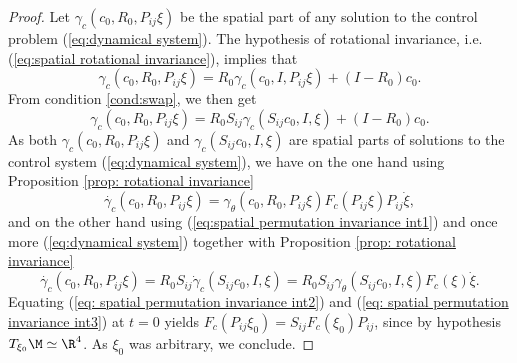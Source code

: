 \begin{proof}
Let $\gamma_c(c_0, R_0, P_{ij} \xi)$ be the spatial part of any solution to the control problem (\ref{eq:dynamical system}). The hypothesis of rotational invariance, i.e. (\ref{eq:spatial rotational invariance}), implies that
\begin{equation}
	\gamma_c(c_0, R_0, P_{ij} \xi) = R_0 \gamma_c(c_0, I, P_{ij} \xi) + (I - R_0)c_0.
\end{equation}
From condition \ref{cond:swap}, we then get
\begin{equation}
\label{eq:spatial permutation invariance int1}
	\gamma_c(c_0, R_0, P_{ij}\xi) = R_0 S_{ij} \gamma_c(S_{ij} c_0, I, \xi) + (I - R_0)c_0.
\end{equation}
As both $\gamma_c(c_0, R_0, P_{ij} \xi)$ and $\gamma_c(S_{ij} c_0, I, \xi)$ are spatial parts of solutions to the control system (\ref{eq:dynamical system}), we have on the one hand using Proposition \ref{prop: rotational invariance}
\begin{equation}
\label{eq: spatial permutation invariance int2}
	\dot{\gamma_c}(c_0, R_0, P_{ij} \xi) = \gamma_{\theta}(c_0, R_0, P_{ij} \xi) F_c(P_{ij} \xi) P_{ij} \dot{\xi},
\end{equation}
and on the other hand using (\ref{eq:spatial permutation invariance int1}) and once more (\ref{eq:dynamical system}) together with Proposition \ref{prop: rotational invariance}
\begin{equation}
\label{eq: spatial permutation invariance int3}
	\dot{\gamma_c}(c_0, R_0, P_{ij} \xi) = R_0 S_{ij} \dot{\gamma}_c(S_{ij} c_0, I, \xi) = R_0 S_{ij} \gamma_\theta(S_{ij} c_0, I, \xi) F_c(\xi) \dot{\xi}.
\end{equation}
Equating (\ref{eq: spatial permutation invariance int2}) and (\ref{eq: spatial permutation invariance int3}) at $t = 0$ yields $ F_c(P_{ij} \xi_0) = S_{ij} F_c(\xi_0) P_{ij}$, since by hypothesis $T_{\xi_0} \M \simeq \R^4$. As $\xi_0$ was arbitrary, we conclude.
\end{proof}

